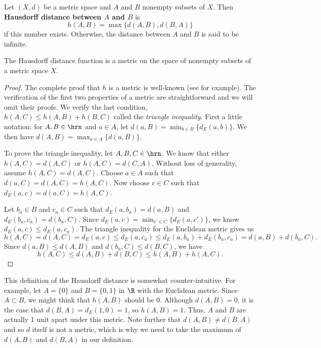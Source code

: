 \begin{definition} \label{def:Hausdorff_distance} Let $(X,d)$ be a metric space and $A$ and $B$ nonempty subsets of $X$. Then \textbf{Hausdorff distance between $A$ and $B$} is 
\[h(A,B) = \max\{d(A,B), d(B,A)\}\]
if this number exists. Otherwise, the distance between $A$ and $B$ is said to be infinite. 
\end{definition}

\begin{theorem} The Hausdorff distance function is a metric on the space of nonempty subsets of a metric space $X$.
\end{theorem}

\begin{proof} 
The complete proof that $h$ is a metric is well-known (see \cite{Barnsley, Edgar} for example). The verification of the first two properties of a metric are straightforward and we will omit their proofs. We verify the last condition, $h(A,C) \leq h(A,B) + h(B,C)$ called the \emph{triangle inequality}. First a little notation: for $A,B \in \hrn$ and $a \in A$, let $d(a,B) = \min_{b \in B} \{d_E(a,b)\}$. We then have $d(A,B) = \max_{a \in A} \{d(a,B)\}$. 

To prove the triangle inequality, let $A,B,C \in\hrn$. We know that either $h(A,C) = d(A,C)$ or $h(A,C) = d(C,A)$. Without loss of generality, assume $h(A,C) = d(A,C)$. Choose $a \in A$ such that $d(a,C) = d(A,C) = h(A,C)$. Now choose $c \in C$ such that $d_E(a,c) = d(a,C) = h(A,C)$.  

Let $b_a \in B$ and $c_a \in C$ such that $d_E(a,b_a) = d(a,B)$ and $d_E(b_a, c_a) = d(b_a,C)$. Since $d_E(a,c) = \min_{c' \in C} \{d_E(a,c')\}$, we know $d_E(a,c) \leq d_E(a,c_a)$. The triangle inequality for the Euclidean metric gives us 
\[h(A,C) = d(A,C) = d_E(a,c) \leq d_E(a,c_a) \leq d_E(a,b_a) + d_E(b_a,c_a) = d(a,B) + d(b_a,C).\]
Since $d(a,B) \leq d(A,B)$ and $d(b_a,C) \leq d(B,C)$, we have 
\[h(A,C) \leq d(A,B) + d(B,C) \leq h(A,B) + h(A,C).\] 

\end{proof}

This definition of the Hausdorff distance is somewhat counter-intuitive. For example, let $A = \{0\}$ and $B = \{0,1\}$ in $\R$ with the Euclidean metric. Since $A \subset B$, we might think that $h(A,B)$ should be 0. Although $d(A,B) = 0$, it is the case that $d(B,A) = d_E(1,0) = 1$, so $h(A,B)=1$. Thus, $A$ and $B$ are actually 1 unit apart under this metric. Note further that $d(A,B) \neq d(B,A)$ and so $d$ itself is not a metric, which is why we need to take the maximum of $d(A,B)$ and $d(B,A)$ in our definition. 



